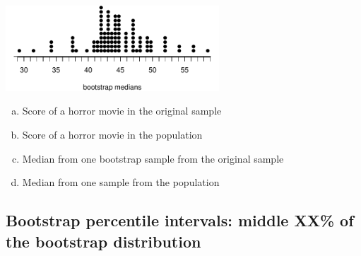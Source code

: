 \documentclass[11pt,containsverbatim,handout,xcolor=xelatex,dvipsnames,table]{beamer}
\newcommand{\solnMult}[1]{#1}
\begin{document}

\begin{frame}
\frametitle{}


\begin{center}
\includegraphics[width = 0.6\textwidth]{figures/movies/horror_boot_med_dot}
\end{center}

\begin{enumerate}[(a)]
\item Score of a horror movie in the original sample
\item Score of a horror movie in the population
\item \solnMult{Median from one bootstrap sample from the original sample}
\item Median from one sample from the population
\end{enumerate}

\end{frame}


\subsection{Bootstrap percentile intervals: middle XX\% of the bootstrap distribution}
\label{mi2}

\end{document}
